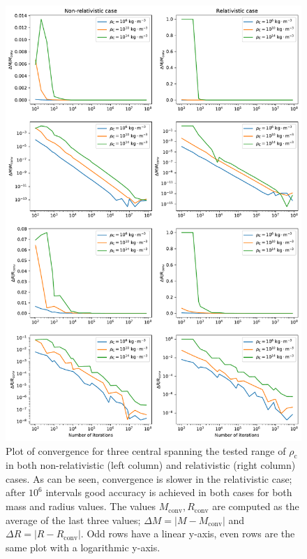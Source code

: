 \documentclass[]{article}
\newcommand{\rhoCentre}{\rho_\mathrm{c}}
\begin{document}
	\begin{figure}[!htb]
		\centering
		\includegraphics[height=0.87\textheight,keepaspectratio]{figures/convergencePlot.pdf}
		\caption{Plot of convergence for three central spanning the tested range of $\rhoCentre$ in both non-relativistic (left column) and relativistic (right column) cases. As can be seen, convergence is slower in the relativistic case; after $10^6$ intervals good accuracy is achieved in both cases for both mass and radius values. The values $M_\textrm{conv}, R_\textrm{conv}$ are computed as the average of the last three values; $\Delta M = \left| M - M_\mathrm{conv}\right|$ and $\Delta R = \left| R - R_\mathrm{conv}\right|$. Odd rows have a linear y-axis, even rows are the same plot with a logarithmic y-axis.\label{fig:convergence-results}}
	\end{figure}
\end{document}
